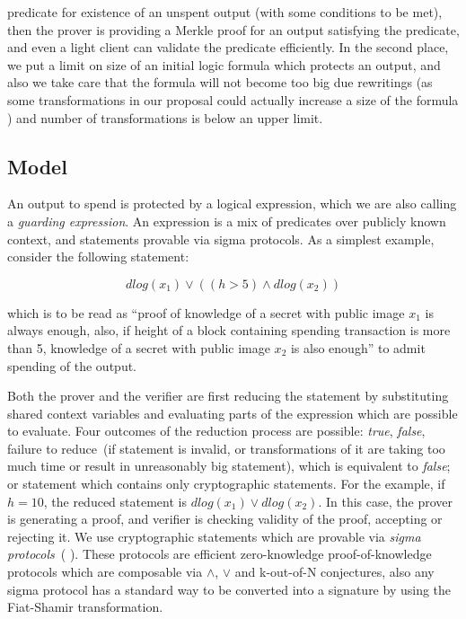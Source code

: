 \documentclass[11pt]{llncs}
\newcommand{\authnote}[2]{\marginpar{\parbox{\marginparwidth}{\tiny %
  \textsf{#1 {\textcolor{blue}{notes: #2}}}}}%
  \textcolor{blue}{\textbf{\dag}}}
\newcommand{\authnote}[2]{
  \textsf{#1 \textcolor{blue}{: #2}}}
\newcommand{\authnote}[2]{}
\newcommand{\knote}[1]{{\authnote{\textcolor{green}{kushti notes}}{#1}}}
\newcommand{\mnote}[1]{{\authnote{\textcolor{blue}{morphic notes}}{#1}}}
\begin{document}
predicate for existence of an unspent output (with some conditions to be met), then the prover is providing a Merkle proof for an output satisfying the predicate, and even a light client can validate the predicate efficiently. In the second place, we put a limit on size of an initial logic formula which protects an output, and also we take care that the formula will not become too big due rewritings (as some transformations in our proposal could actually increase a size of the formula\mnote{For example? Looks like all the transforms are decreasing.}) and number of transformations is below an upper limit.

\subsection{Model}

An output to spend is protected by a logical expression, which we are also calling a {\em guarding expression}. An expression is a mix of predicates over publicly known context, and statements provable via sigma protocols. As a simplest example, consider the following statement:

\begin{equation}
\label{eq:example1}
dlog(x_1) \lor ((h > 5) \land dlog(x_2))
\end{equation}

which is to be read as ``proof of knowledge of a secret with public image $x_1$ is always enough, also, if height of a block containing spending transaction is more than 5, knowledge of a secret with public image $x_2$ is also enough'' to admit spending of the output.

Both the prover and the verifier are first reducing the statement by substituting shared context variables and evaluating parts of the expression which are possible to evaluate. Four outcomes of the reduction process are possible: {\em true}, {\em false}, failure to reduce~(if statement is invalid, or transformations of it are taking too much time or result in unreasonably big statement), which is equivalent to {\em false}; or statement which contains only cryptographic statements. For the example, if $h = 10$, the reduced statement is $dlog(x_1) \lor dlog(x_2)$. In this case, the prover is generating a proof, and verifier is checking validity of the proof, accepting or rejecting it. We use cryptographic statements which are provable via {\em sigma protocols}~(\knote{links}). These protocols are efficient zero-knowledge \knote{special honest verifier ZK actually} proof-of-knowledge protocols which are composable via $\land$, $\lor$ and k-out-of-N conjectures, also any sigma protocol has a standard way to be converted into a signature by using the Fiat-Shamir transformation. 
\end{document}
